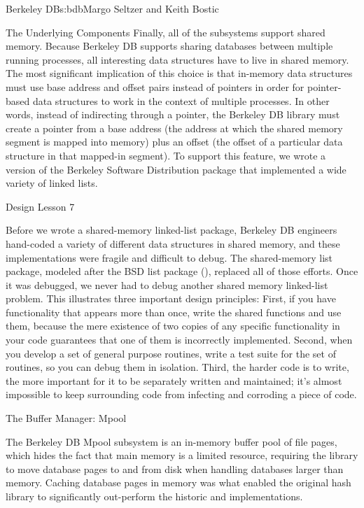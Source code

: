 \begin{aosachapter}{Berkeley DB}{s:bdb}{Margo Seltzer and Keith Bostic}
\begin{aosasect1}{The Underlying Components}
Finally, all of the subsystems support shared memory. Because Berkeley
DB supports sharing databases between multiple running processes, all
interesting data structures have to live in shared memory. The most
significant implication of this choice is that in-memory data
structures must use base address and offset pairs instead of pointers
in order for pointer-based data structures to work in the context of
multiple processes. In other words, instead of indirecting through a
pointer, the Berkeley DB library must create a pointer from a base
address (the address at which the shared memory segment is mapped into
memory) plus an offset (the offset of a particular data structure in
that mapped-in segment). To support this feature, we
wrote a version of the Berkeley Software Distribution  package
that implemented a wide variety of linked lists. 

\begin{aosabox}{Design Lesson 7}

Before we wrote a shared-memory linked-list package, Berkeley DB
engineers hand-coded a variety of different data structures in shared
memory, and these implementations were fragile and difficult to
debug. The shared-memory list package, modeled after the BSD list
package (), replaced all of those efforts.  Once it was
debugged, we never had to debug another shared memory linked-list
problem.  This illustrates three important design principles: First,
if you have functionality that appears more than once, write the
shared functions and use them, because the mere existence of two
copies of any specific functionality in your code guarantees that one
of them is incorrectly implemented.  Second, when you develop a set of
general purpose routines, write a test suite for the set of routines,
so you can debug them in isolation.  Third, the harder code is to
write, the more important for it to be separately written and
maintained; it's almost impossible to keep surrounding code from
infecting and corroding a piece of code.

\end{aosabox}

\end{aosasect1}

\begin{aosasect1}{The Buffer Manager: Mpool}

The Berkeley DB Mpool subsystem is an in-memory buffer pool of file
pages, which hides the fact that main memory is a limited resource,
requiring the library to move database pages to and from disk when
handling databases larger than memory. Caching database pages in
memory was what enabled the original hash library to significantly
out-perform the historic  and 
implementations.


\end{aosasect1}
\end{aosachapter}
